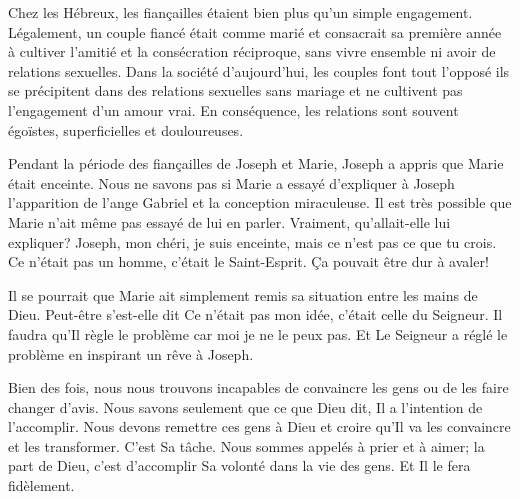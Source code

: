


Chez les Hébreux, les fiançailles étaient bien plus qu'un simple engagement. Légalement, un couple fiancé était comme marié et consacrait sa première année à cultiver l'amitié et la consécration réciproque, sans vivre ensemble ni avoir de relations sexuelles. Dans la société d'aujourd'hui, les couples font tout l'opposé \ocadr ils se précipitent dans des relations sexuelles sans mariage et ne cultivent pas l'engagement d'un amour vrai. En conséquence, les relations sont souvent égoïstes, superficielles et douloureuses.

Pendant la période des fiançailles de Joseph et Marie, Joseph a appris que Marie était enceinte. Nous ne savons pas si Marie a essayé d'expliquer à Joseph l'apparition de l'ange Gabriel et la conception miraculeuse. Il est très possible que Marie n'ait même pas essayé de lui en parler. Vraiment, qu'allait-elle lui expliquer? \Og Joseph, mon chéri, je suis enceinte, mais ce n'est pas ce que tu crois. Ce n'était pas un homme, c'était le Saint-Esprit. \Fg{} Ça pouvait être dur à avaler!

Il se pourrait que Marie ait simplement remis sa situation entre les mains de Dieu. Peut-être s'est-elle dit\frcolon{} \Og Ce n'était pas mon idée, c'était celle du Seigneur. Il faudra qu'Il règle le problème car moi je ne le peux pas. \Fg{} Et Le Seigneur a réglé le problème en inspirant un rêve à Joseph.

Bien des fois, nous nous trouvons incapables de convaincre les gens ou de les faire changer d'avis. Nous savons seulement que ce que Dieu dit, Il a l'intention de l'accomplir. Nous devons remettre ces gens à Dieu et croire qu'Il va les convaincre et les transformer. C'est Sa tâche. Nous sommes appelés à prier et à aimer; la part de Dieu, c'est d'accomplir Sa volonté dans la vie des gens. Et Il le fera fidèlement.


\begin{dvquotes}
\end{dvquotes}


                      

